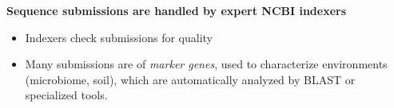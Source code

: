 \documentclass[landscape]{slides}
\begin{document}
\begin{slide}
\begin{center}
\textbf{Sequence submissions are handled by expert NCBI indexers}
\end{center}

\small
\begin{itemize}
\item Indexers check submissions for quality
\item Many submissions are of \emph{marker genes}, used to
  characterize environments (microbiome, soil), which are
  automatically analyzed by BLAST or specialized tools.
\end{itemize}

\medskip


\end{slide}
\end{document}
